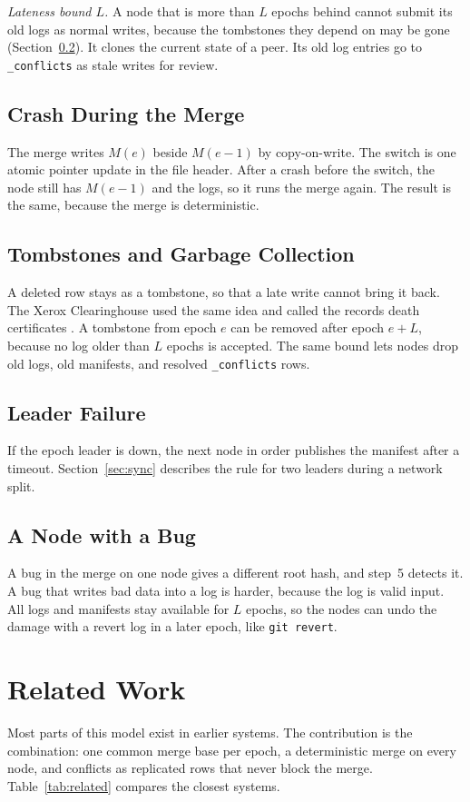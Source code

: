 \documentclass[journal]{IEEEtran}
\newcommand{\code}[1]{\texttt{#1}}
\begin{document}
\emph{Lateness bound $L$.} A node that is more than $L$ epochs behind cannot submit its old logs as normal writes, because the tombstones they depend on may be gone (Section~\ref{sec:gc}). It clones the current state of a peer. Its old log entries go to \code{\_conflicts} as stale writes for review.

\subsection{Crash During the Merge}
The merge writes $M(e)$ beside $M(e{-}1)$ by copy-on-write. The switch is one atomic pointer update in the file header. After a crash before the switch, the node still has $M(e{-}1)$ and the logs, so it runs the merge again. The result is the same, because the merge is deterministic.

\subsection{Tombstones and Garbage Collection}\label{sec:gc}
A deleted row stays as a tombstone, so that a late write cannot bring it back. The Xerox Clearinghouse used the same idea and called the records death certificates \cite{demers1987}. A tombstone from epoch $e$ can be removed after epoch $e+L$, because no log older than $L$ epochs is accepted. The same bound lets nodes drop old logs, old manifests, and resolved \code{\_conflicts} rows.

\subsection{Leader Failure}
If the epoch leader is down, the next node in order publishes the manifest after a timeout. Section~\ref{sec:sync} describes the rule for two leaders during a network split.

\subsection{A Node with a Bug}
A bug in the merge on one node gives a different root hash, and step~5 detects it. A bug that writes bad data into a log is harder, because the log is valid input. All logs and manifests stay available for $L$ epochs, so the nodes can undo the damage with a revert log in a later epoch, like \code{git revert}.

\section{Related Work}
Most parts of this model exist in earlier systems. The contribution is the combination: one common merge base per epoch, a deterministic merge on every node, and conflicts as replicated rows that never block the merge. Table~\ref{tab:related} compares the closest systems.
\end{document}
